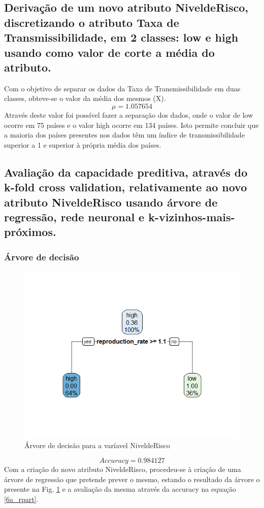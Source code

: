 \documentclass[conference]{IEEEtran}
\begin{document}
\subsection{Derivação de um novo atributo NiveldeRisco, discretizando o atributo Taxa de Transmissibilidade, em 2 classes: low e high usando como valor de corte a média do atributo.}
\label{ex05}
Com o objetivo de separar os dados da Taxa de Transmissibilidade em duas classes, obteve-se o valor da média dos mesmos (X).
\begin{equation}
\mu = 1.057654\label{4_ttest}
\end{equation}
Através deste valor foi possível fazer a separação dos dados, onde o valor de low ocorre em 75 países e o valor high ocorre em 134 países. Isto permite concluir que a maioria dos países presentes nos dados têm um índice de transmissibilidade superior a 1 e superior à própria média dos países.


\subsection{Avaliação da capacidade preditiva, através do k-fold cross validation, relativamente ao novo atributo NiveldeRisco usando árvore de regressão, rede neuronal e k-vizinhos-mais-próximos.}
\subsubsection{Árvore de decisão}
\begin{figure}[htbp]
\centerline{\includegraphics[width=0.95\columnwidth]{images/06_1.png}}
\caption{Árvore de decisão para a varíavel NiveldeRisco}
\label{6a_rpart}
\end{figure}
\begin{equation}
Accuracy = 0.984127\label{6a_accuracy}
\end{equation}
Com a criação do novo atributo NiveldeRisco, procedeu-se à criação de uma árvore de regressão que pretende prever o mesmo, estando o resultado da árvore o presente na Fig. \ref{6a_rpart} e a avaliação da mesma através da accuracy na equação \eqref{6a_rpart}.
\end{document}
